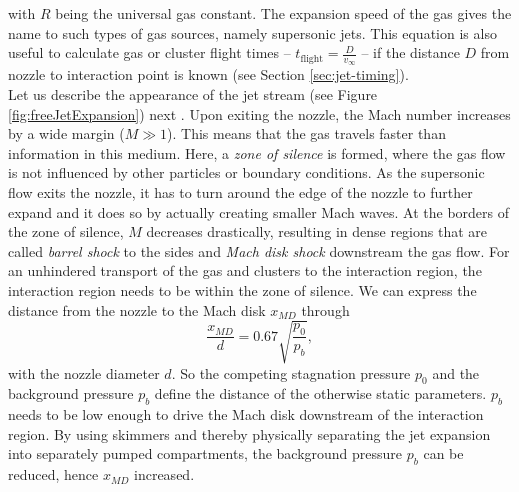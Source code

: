 with $R$ being the universal gas constant. The expansion speed of the gas gives the name to such types of gas sources, namely supersonic jets. This equation is also useful to calculate gas or cluster flight times -- $t_{\text{flight}}=\frac{D}{v_{\infty}}$ -- if the distance $D$ from nozzle to interaction point is known (see Section \ref{sec:jet-timing}). \\[1\baselineskip]
%
Let us describe the appearance of the jet stream (see Figure \ref{fig:freeJetExpansion}) next \citep{Miller-1988-Oxford}. Upon exiting the nozzle, the Mach number increases by a wide margin ($M\gg 1$). This means that the gas travels faster than information in this medium. Here, a \textit{zone of silence} is formed, where the gas flow is not influenced by other particles or boundary conditions. As the supersonic flow exits the nozzle, it has to turn around the edge of the nozzle to further expand and it does so by actually creating smaller Mach waves. At the borders of the zone of silence, $M$ decreases drastically, resulting in dense regions that are called \textit{barrel shock} to the sides and \textit{Mach disk shock} downstream the gas flow. For an unhindered transport of the gas and clusters to the interaction region, the interaction region needs to be within the zone of silence. We can express the distance from the nozzle to the Mach disk $x_{MD}$ through
\begin{equation}
\frac{x_{MD}}{d}=0.67\sqrt{\frac{p_{0}}{p_{b}}},
\label{eq:distance-of-mach-disk}
\end{equation}
with the nozzle diameter $d$. So the competing stagnation pressure $p_{0}$ and the background pressure $p_{b}$ define the distance of the otherwise static parameters. $p_{b}$ needs to be low enough to drive the Mach disk downstream of the interaction region. By using skimmers and thereby physically separating the jet expansion into separately pumped compartments, the background pressure $p_{b}$ can be reduced, hence $x_{MD}$ increased.\\[1\baselineskip]
%
